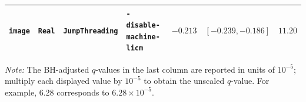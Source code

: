 \begin{table}[t]
{\begin{tabular}{@{}lllp{4.5cm}rrr@{}}
\texttt{image} & \texttt{Real} & \texttt{JumpThreading} & \texttt{-disable-\allowbreak{}machine-\allowbreak{}licm} & $-0.213$ & $[-0.239,-0.186]$ & $11.20$ \\
\hline
\end{tabular}%
}
\vspace{1mm}
\begin{minipage}{0.98\textwidth}
\footnotesize
\textit{Note:} The BH-adjusted $q$-values in the last column are reported in units of $10^{-5}$; multiply each displayed value by $10^{-5}$ to obtain the unscaled $q$-value. For example, 6.28 corresponds to $6.28\times10^{-5}$.
\end{minipage}
\end{table}
